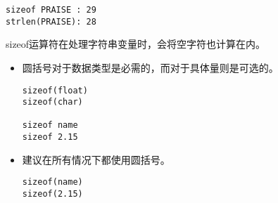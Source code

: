 \begin{frame}[fragile]
\begin{lstlisting}[backgroundcolor=\color{red!10}]
sizeof PRAISE : 29
strlen(PRAISE): 28
\end{lstlisting}

sizeof运算符在处理字符串变量时，会将空字符也计算在内。
\end{frame}

\begin{frame}[fragile]
\begin{itemize}
\item 圆括号对于数据类型是必需的，而对于具体量则是可选的。
\begin{lstlisting}[backgroundcolor=\color{red!10}]
sizeof(float)
sizeof(char)

sizeof name
sizeof 2.15
\end{lstlisting}
\item 建议在所有情况下都使用圆括号。
\begin{lstlisting}[backgroundcolor=\color{red!10}]
sizeof(name)
sizeof(2.15)
\end{lstlisting}
\end{itemize}
\end{frame}

